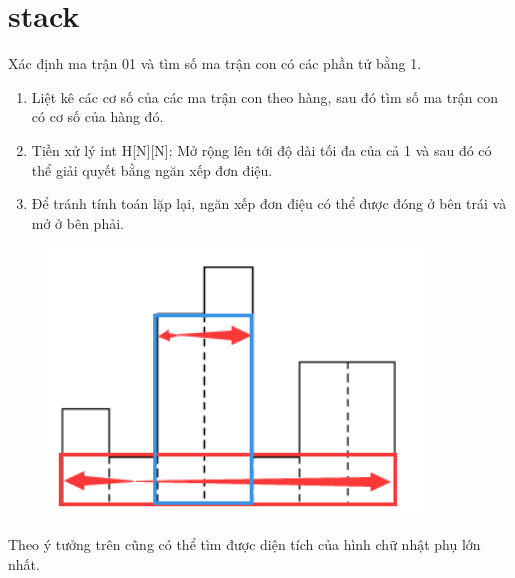 \section{stack}

\par \noindent Xác định ma trận 01 và tìm số ma trận con có các phần tử bằng 1.

\begin{enumerate}
\item Liệt kê các cơ số của các ma trận con theo hàng, sau đó tìm số ma trận con có cơ số của hàng đó.
\item Tiền xử lý int H[N][N]: Mở rộng lên tới độ dài tối đa của cả 1 và sau đó có thể giải quyết bằng ngăn xếp đơn điệu.
\item Để tránh tính toán lặp lại, ngăn xếp đơn điệu có thể được đóng ở bên trái và mở ở bên phải.
\end{enumerate}

\begin{figure}
        \centering
        \par \includegraphics[width=10cm]{images/stack.png}
\end{figure}

\par \noindent Theo ý tưởng trên cũng có thể tìm được diện tích của hình chữ nhật phụ lớn nhất.
~\\

